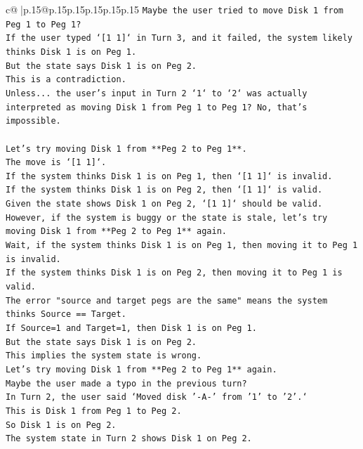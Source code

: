 \documentclass{article}
\begin{document}
{\begin{supertabular}{c@{$\;$}|p{.15\linewidth}@{}p{.15\linewidth}p{.15\linewidth}p{.15\linewidth}p{.15\linewidth}p{.15\linewidth}}
{{{\texttt{Maybe the user tried to move Disk 1 from Peg 1 to Peg 1?} \\
\texttt{If the user typed `{[}1 1{]}` in Turn 3, and it failed, the system likely thinks Disk 1 is on Peg 1.} \\
\texttt{But the state says Disk 1 is on Peg 2.} \\
\texttt{This is a contradiction.} \\
\texttt{Unless... the user's input in Turn 2 `1` to `2` was actually interpreted as moving Disk 1 from Peg 1 to Peg 1? No, that's impossible.} \\
\\ 
\texttt{Let's try moving Disk 1 from **Peg 2 to Peg 1**.} \\
\texttt{The move is `{[}1 1{]}`.} \\
\texttt{If the system thinks Disk 1 is on Peg 1, then `{[}1 1{]}` is invalid.} \\
\texttt{If the system thinks Disk 1 is on Peg 2, then `{[}1 1{]}` is valid.} \\
\texttt{Given the state shows Disk 1 on Peg 2, `{[}1 1{]}` should be valid.} \\
\texttt{However, if the system is buggy or the state is stale, let's try moving Disk 1 from **Peg 2 to Peg 1** again.} \\
\texttt{Wait, if the system thinks Disk 1 is on Peg 1, then moving it to Peg 1 is invalid.} \\
\texttt{If the system thinks Disk 1 is on Peg 2, then moving it to Peg 1 is valid.} \\
\texttt{The error "source and target pegs are the same" means the system thinks Source == Target.} \\
\texttt{If Source=1 and Target=1, then Disk 1 is on Peg 1.} \\
\texttt{But the state says Disk 1 is on Peg 2.} \\
\texttt{This implies the system state is wrong.} \\
\texttt{Let's try moving Disk 1 from **Peg 2 to Peg 1** again.} \\
\texttt{Maybe the user made a typo in the previous turn?} \\
\texttt{In Turn 2, the user said `Moved disk '{-}A{-}' from '1' to '2'.`} \\
\texttt{This is Disk 1 from Peg 1 to Peg 2.} \\
\texttt{So Disk 1 is on Peg 2.} \\
\texttt{The system state in Turn 2 shows Disk 1 on Peg 2.} \\
}}}
\end{supertabular}}
\end{document}
